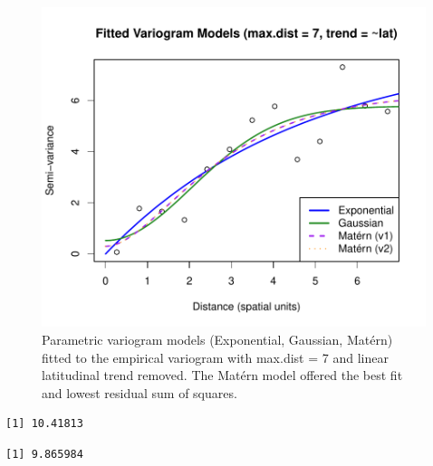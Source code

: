 \documentclass[
  11pt,
]{article}
\newenvironment{Shaded}{\begin{snugshade}}{\end{snugshade}}
\newcommand{\CommentTok}[1]{\textcolor[rgb]{0.37,0.37,0.37}{#1}}
\newcommand{\NormalTok}[1]{\textcolor[rgb]{0.00,0.23,0.31}{#1}}
\newcommand{\SpecialCharTok}[1]{\textcolor[rgb]{0.37,0.37,0.37}{#1}}
\begin{document}
\begin{figure}[H]

{\centering \includegraphics{project_files/figure-pdf/fig-variogfit-1.pdf}

}

\caption{Parametric variogram models (Exponential, Gaussian, Matérn)
fitted to the empirical variogram with max.dist = 7 and linear
latitudinal trend removed. The Matérn model offered the best fit and
lowest residual sum of squares.}

\end{figure}%

\begin{Shaded}
\end{Shaded}

\begin{verbatim}
[1] 10.41813
\end{verbatim}

\begin{Shaded}
\end{Shaded}

\begin{verbatim}
[1] 9.865984
\end{verbatim}
\end{document}
